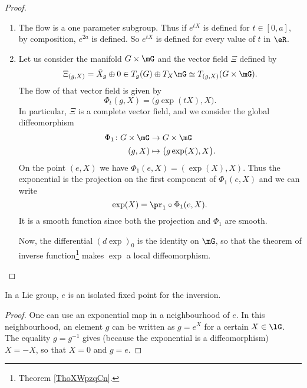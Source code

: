 \begin{theorem}
\begin{proof}
\begin{enumerate}
		\item
		      The flow is a one parameter subgroup. Thus if $ e^{tX}$ is defined for $t\in[0,a]$, by composition, $ e^{2a}$ is defined. So $ e^{tX}$ is defined for every value of $t$ in $\eR$.
		\item
		      Let us consider the manifold $G\times \mG$ and the vector field $\Xi$ defined by
		      \begin{equation}
			      \Xi_{(g,X)}=\tilde X_g\oplus 0\in T_g(G)\oplus T_X\mG\simeq T_{(g,X)}(G\times \mG).
		      \end{equation}
		      The flow of that vector field is given by
		      \begin{equation}
			      \Phi_t(g,X)=\big( g\exp(tX),X \big).
		      \end{equation}
		      In particular, $\Xi$ is a complete vector field, and we consider the global diffeomorphism
		      \begin{equation}
			      \begin{aligned}
				      \Phi_1\colon G\times \mG & \to G\times \mG                 \\
				      (g,X)                    & \mapsto \big( g\exp(X),X \big).
			      \end{aligned}
		      \end{equation}
		      On the point $(e,X)$ we have $\Phi_1(e,X)=(\exp(X),X)$. Thus the exponential is the projection on the first component of $\Phi_1(e,X)$ and we can write
		      \begin{equation}
			      \exp(X)=\pr_1\circ\Phi_1(e,X).
		      \end{equation}
		      It is a smooth function since both the projection and $\Phi_1$ are smooth.

		      Now, the differential $(d\exp)_0$ is the identity on $\mG$, so that the theorem of inverse function\footnote{Theorem \ref{ThoXWpzqCn}.} makes $\exp$ a local diffeomorphism.
	\end{enumerate}
\end{proof}


\begin{lemma}
	In a Lie group, $e$ is an isolated fixed point for the inversion.
\end{lemma}

\begin{proof}
	One can use an exponential map in a neighbourhood of $e$. In this neighbourhood, an element $g$ can be written as $g=e^X$ for a certain $X\in\lG$. The equality $g=g^{-1}$ gives (because the exponential is a diffeomorphism) $X=-X$, so that $X=0$ and $g=e$.
\end{proof}


\end{theorem}
